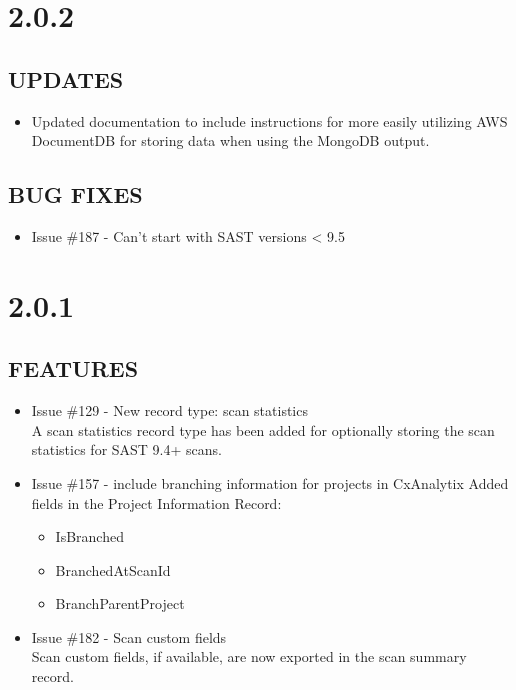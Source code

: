 \section{2.0.2}

\subsection*{UPDATES}
\begin{itemize}
    \item Updated documentation to include instructions for more easily 
    utilizing AWS DocumentDB for storing data when using the MongoDB
    output.
\end{itemize}

\subsection*{BUG FIXES}
\begin{itemize}
    \item Issue \#187 - Can't start with SAST versions < 9.5
\end{itemize}


\section{2.0.1}

\subsection*{FEATURES}
    \begin{itemize}
        \item Issue \#129 - New record type: scan statistics\\
		\indent A scan statistics record type has been added for optionally storing the scan statistics for SAST 9.4+ scans.
	
        \item Issue \#157 - include branching information for projects in CxAnalytix
		\indent Added fields in the Project Information Record:
        \begin{itemize}
			\item IsBranched
			\item BranchedAtScanId
			\item BranchParentProject
        \end{itemize}
			
	    \item Issue \#182 - Scan custom fields\\
		\indent Scan custom fields, if available, are now exported in the scan summary record.    
    \end{itemize}

